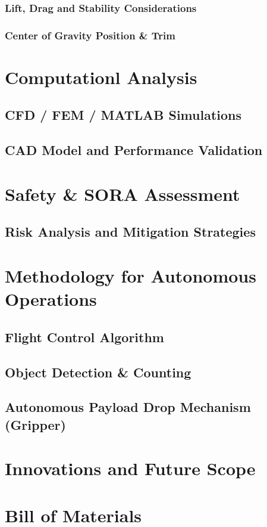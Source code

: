 \documentclass[12pt]{report}
\begin{document}
      \subsection{Lift, Drag and Stability Considerations}
      \subsection{Center of Gravity Position \& Trim}

  \chapter{Computationl Analysis}
    \section{CFD / FEM / MATLAB Simulations}
    \section{CAD Model and Performance Validation}
  \chapter{Safety \& SORA Assessment}
    \section{Risk Analysis and Mitigation Strategies}
      
  \chapter{Methodology for Autonomous Operations}
    \section{Flight Control Algorithm}
    \section{Object Detection \& Counting}
    \section{Autonomous Payload Drop Mechanism (Gripper)}

  \chapter{Innovations and Future Scope}
  \chapter{Bill of Materials}
\end{document}
